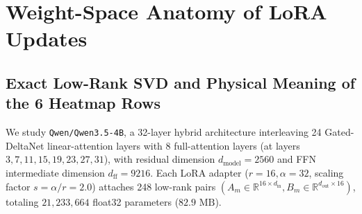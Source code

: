 \documentclass[11pt,a4paper]{article}
\begin{document}
\section{Weight-Space Anatomy of LoRA Updates}

\subsection{Exact Low-Rank SVD and Physical Meaning of the 6 Heatmap Rows}
We study \texttt{Qwen/Qwen3.5-4B}, a 32-layer hybrid architecture interleaving 24 Gated-DeltaNet linear-attention layers with 8 full-attention layers (at layers $3, 7, 11, 15, 19, 23, 27, 31$), with residual dimension $d_{\text{model}} = 2560$ and FFN intermediate dimension $d_{\text{ff}} = 9216$. Each LoRA adapter ($r=16, \alpha=32$, scaling factor $s = \alpha/r = 2.0$) attaches 248 low-rank pairs $(A_m \in \mathbb{R}^{16 \times d_{\text{in}}}, B_m \in \mathbb{R}^{d_{\text{out}} \times 16})$, totaling $21,233,664$ float32 parameters ($82.9\text{ MB}$).
\end{document}
